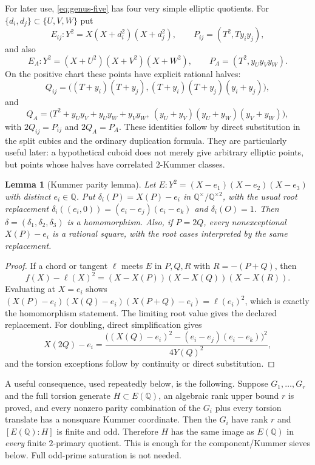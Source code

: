 \documentclass[11pt,a4paper]{amsart}
\newtheorem{lemma}[theorem]{Lemma}
\newcommand{\Q}{\mathbb Q}
\begin{document}
For later use, \eqref{eq:genus-five} has four very simple elliptic quotients. For $\{d_i,d_j\}\subset\{U,V,W\}$ put
\[
E_{ij}:Y^2=X(X+d_i^2)(X+d_j^2),\qquad
P_{ij}=(T^2,T y_i y_j),
\]
and also
\[
E_A:Y^2=(X+U^2)(X+V^2)(X+W^2),\qquad
P_A=(T^2,y_Uy_Vy_W).
\]
On the positive chart these points have explicit rational halves:
\[
Q_{ij}=\bigl((T+y_i)(T+y_j),(T+y_i)(T+y_j)(y_i+y_j)\bigr),
\]
and
\[
Q_A=\bigl(T^2+y_Uy_V+y_Uy_W+y_Vy_W,\ (y_U+y_V)(y_U+y_W)(y_V+y_W)\bigr),
\]
with $2Q_{ij}=P_{ij}$ and $2Q_A=P_A$. These identities follow by direct substitution in the split cubics and the ordinary duplication formula. They are particularly useful later: a hypothetical cuboid does not merely give arbitrary elliptic points, but points whose halves have correlated $2$-Kummer classes.

\begin{lemma}[Kummer parity lemma]\label{lem:kummer}
Let $E:Y^2=(X-e_1)(X-e_2)(X-e_3)$ with distinct $e_i\in\Q$. Put $\delta_i(P)=X(P)-e_i$ in $\Q^\times/\Q^{\times2}$, with the usual root replacement $\delta_i((e_i,0))=(e_i-e_j)(e_i-e_k)$ and $\delta_i(O)=1$. Then $\delta=(\delta_1,\delta_2,\delta_3)$ is a homomorphism. Also, if $P=2Q$, every nonexceptional $X(P)-e_i$ is a rational square, with the root cases interpreted by the same replacement.
\end{lemma}

\begin{proof}
If a chord or tangent $\ell$ meets $E$ in $P,Q,R$ with $R=-(P+Q)$, then
\[
f(X)-\ell(X)^2=(X-X(P))(X-X(Q))(X-X(R)).
\]
Evaluating at $X=e_i$ shows $(X(P)-e_i)(X(Q)-e_i)(X(P+Q)-e_i)=\ell(e_i)^2$, which is exactly the homomorphism statement. The limiting root value gives the declared replacement. For doubling, direct simplification gives
\[
X(2Q)-e_i=
\frac{\bigl((X(Q)-e_i)^2-(e_i-e_j)(e_i-e_k)\bigr)^2}{4Y(Q)^2},
\]
and the torsion exceptions follow by continuity or direct substitution.
\end{proof}

A useful consequence, used repeatedly below, is the following. Suppose $G_1,\ldots,G_r$ and the full torsion generate $H\subset E(\Q)$, an algebraic rank upper bound $r$ is proved, and every nonzero parity combination of the $G_i$ plus every torsion translate has a nonsquare Kummer coordinate. Then the $G_i$ have rank $r$ and $[E(\Q):H]$ is finite and odd. Therefore $H$ has the same image as $E(\Q)$ in \emph{every} finite $2$-primary quotient. This is enough for the component/Kummer sieves below. Full odd-prime saturation is not needed.
\end{document}
